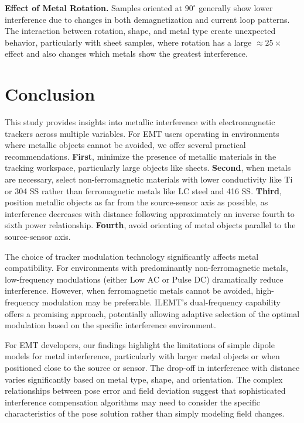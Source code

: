 \documentclass[journal,twoside,web]{ieeecolor}
\begin{document}
\textbf{Effect of Metal Rotation.}
Samples oriented at $90^{\circ}$ generally show lower interference due to changes in both demagnetization and current loop patterns. The interaction between rotation, shape, and metal type create unexpected behavior, particularly with sheet samples, where rotation has a large $\approx 25\times$ effect and also changes which metals show the greatest interference. 

\section{Conclusion}
This study provides insights into metallic interference with electromagnetic trackers across multiple variables. For EMT users operating in environments where metallic objects cannot be avoided, we offer several practical recommendations. \textbf{First}, minimize the presence of metallic materials in the tracking workspace, particularly large objects like sheets. \textbf{Second}, when metals are necessary, select non-ferromagnetic materials with lower conductivity like Ti or 304 SS rather than ferromagnetic metals like LC steel and 416 SS. \textbf{Third}, position metallic objects as far from the source-sensor axis as possible, as interference decreases with distance following approximately an inverse fourth to sixth power relationship. \textbf{Fourth}, avoid orienting of metal objects parallel to the source-sensor axis.

The choice of tracker modulation technology significantly affects metal compatibility. For environments with predominantly non-ferromagnetic metals, low-frequency modulations (either Low AC or Pulse DC) dramatically reduce interference. However, when ferromagnetic metals cannot be avoided, high-frequency modulation may be preferable. ILEMT's dual-frequency capability offers a promising approach, potentially allowing adaptive selection of the optimal modulation based on the specific interference environment.

For EMT developers, our findings highlight the limitations of simple dipole models for metal interference, particularly with larger metal objects or when positioned close to the source or sensor. The drop-off in interference with distance varies significantly based on metal type, shape, and orientation. The complex relationships between pose error and field deviation suggest that sophisticated interference compensation algorithms may need to consider the specific characteristics of the pose solution rather than simply modeling field changes.
\end{document}
